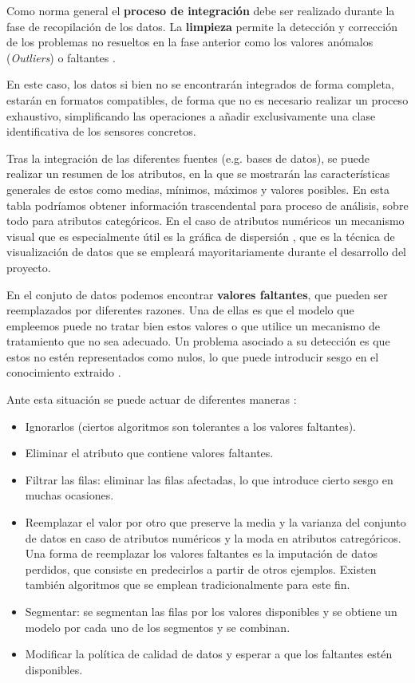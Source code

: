 Como norma general el \textbf{proceso de integración} debe ser realizado durante la fase de recopilación de los datos.
La \textbf{limpieza} permite la detección y corrección de los problemas no resueltos en la fase anterior como los valores anómalos (\textit{Outliers}) o faltantes 
\cite{book:hernandez2004}.  

En este caso, los datos si bien no se encontrarán integrados de forma completa, estarán en formatos compatibles, de forma que no es necesario
realizar un proceso exhaustivo, simplificando las operaciones a añadir exclusivamente una clase identificativa de los sensores concretos.

Tras la integración de las diferentes fuentes (e.g. bases de datos), se puede realizar un resumen de los atributos, en la que
se mostrarán las características generales de estos como medias, mínimos, máximos y valores posibles. 
En esta tabla podríamos obtener información trascendental para proceso de análisis, sobre todo para atributos categóricos.
En el caso de atributos numéricos un mecanismo visual que es especialmente útil es la gráfica de dispersión \cite{book:hernandez2004}, que es la técnica de visualización
de datos que se empleará mayoritariamente durante el desarrollo del proyecto.

En el conjuto de datos podemos encontrar \textbf{valores faltantes}, que pueden ser reemplazados por diferentes razones. Una de ellas es que
el modelo que empleemos puede no tratar bien estos valores o que utilice un mecanismo de tratamiento que no sea adecuado.
Un problema asociado a su detección es que estos no estén representados como nulos, lo que puede introducir sesgo en el conocimiento
extraido \cite{book:hernandez2004}.

Ante esta situación se puede actuar de diferentes maneras \cite{book:hernandez2004}:
\begin{itemize}
    \item Ignorarlos (ciertos algoritmos son tolerantes a los valores faltantes).
    \item Eliminar el atributo que contiene valores faltantes.
    \item Filtrar las filas: eliminar las filas afectadas, lo que introduce cierto sesgo en muchas ocasiones.
    \item Reemplazar el valor por otro que preserve la media y la varianza del conjunto de datos en caso de atributos numéricos y la moda en atributos
        catregóricos.
        Una forma de reemplazar los valores faltantes es la imputación de datos perdidos, que consiste en predecirlos a partir de otros ejemplos. Existen también
        algoritmos que se emplean tradicionalmente para este fin.
    \item Segmentar: se segmentan las filas por los valores disponibles y se obtiene un modelo por cada uno de los segmentos y se combinan.
    \item Modificar la política de calidad de datos y esperar a que los faltantes estén disponibles.
\end{itemize}

